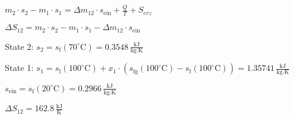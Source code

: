 \( m_2 \cdot s_2 - m_1 \cdot s_1 = \Delta m_{12} \cdot s_\text{ein} + \frac{Q}{T} + S_{erz} \)  

\( \Delta S_{12} = m_2 \cdot s_2 - m_1 \cdot s_1 - \Delta m_{12} \cdot s_\text{ein} \)  

State 2:  
\( s_2 = s_\text{f}(70^\circ \text{C}) = 0.3548 \, \frac{\text{kJ}}{\text{kg·K}} \)  

State 1:  
\( s_1 = s_\text{f}(100^\circ \text{C}) + x_1 \cdot (s_\text{fg}(100^\circ \text{C}) - s_\text{f}(100^\circ \text{C})) = 1.35741 \, \frac{\text{kJ}}{\text{kg·K}} \)  

\( s_\text{ein} = s_\text{f}(20^\circ \text{C}) = 0.2966 \, \frac{\text{kJ}}{\text{kg·K}} \)  

\( \Delta S_{12} = 162.8 \, \frac{\text{kJ}}{\text{K}} \)